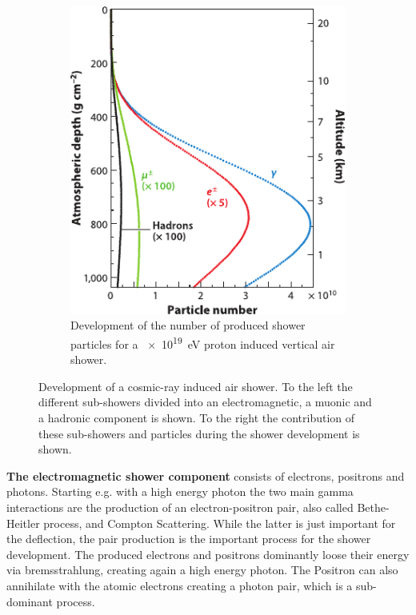 \begin{figure}
\begin{subfigure}[t]{0.47\textwidth}
        \includegraphics[width=\textwidth]{./images/air_shower_development.pdf}
        \caption{Development of the number of produced shower particles for a \SI{e19}{eV} proton induced vertical air shower. \cite{Engel11EAS}}
        \label{fig:air_shower_development}
    \end{subfigure}
    \caption{Development of a cosmic-ray induced air shower. To the left the different sub-showers divided into an electromagnetic, a muonic and a hadronic component is shown. To the right the contribution of these sub-showers and particles during the shower development is shown.}
    \label{fig:air_shower}
\end{figure}

\textbf{The electromagnetic shower component} consists of electrons, positrons and photons.
Starting e.g. with a high energy photon the two main gamma interactions are the production of an electron-positron pair, also called Bethe-Heitler process, and Compton Scattering.
While the latter is just important for the deflection, the pair production is the important process for the shower development.
The produced electrons and positrons dominantly loose their energy via bremsstrahlung, creating again a high energy photon.
The Positron can also annihilate with the atomic electrons creating a photon pair, which is a sub-dominant process.

